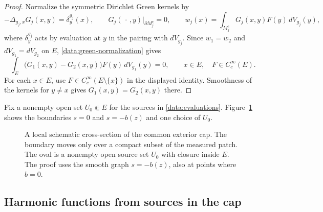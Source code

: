 \documentclass[11pt,a4paper]{article}
\theoremstyle{definition}
\theoremstyle{remark}
\numberwithin{equation}{section}
\begin{document}
\begin{proof}
Normalize the symmetric Dirichlet Green kernels by
\begin{equation}\label{data:green-normalization}
 -\Delta_{g_j,x}G_j(x,y)=\delta_y^{g_j}(x),\qquad
 G_j(\,\cdot\,,y)|_{\partial M_j^e}=0,
 \qquad
 w_j(x)=\int_{M_j^e}G_j(x,y)F(y)\,dV_{g_j}(y),
\end{equation}
where $\delta_y^{g_j}$ acts by evaluation at $y$ in the pairing with
$dV_{g_j}$. Since $w_1=w_2$ and $dV_{g_1}=dV_{g_2}$ on $E$,
\eqref{data:green-normalization} gives
\[
 \int_E \bigl(G_1(x,y)-G_2(x,y)\bigr)F(y)\,dV_{g_1}(y)=0,
 \qquad x\in E,\quad F\in C_c^\infty(E).
\]
For each $x\in E$, use $F\in C_c^\infty(E\setminus\{x\})$ in the
displayed identity. Smoothness of the kernels for $y\ne x$ gives
$G_1(x,y)=G_2(x,y)$ there.
\end{proof}

Fix a nonempty open set $U_0\Subset E$ for the sources in
\eqref{data:evaluations}. Figure~\ref{data:cap-figure} shows the
boundaries $s=0$ and $s=-b(z)$ and one choice of $U_0$.

\begin{figure}[htbp]
\centering
{}
\caption{A local schematic cross-section of the common exterior cap.
The boundary moves only over a compact subset of the measured patch.
The oval is a nonempty open source set $U_0$ with closure inside $E$.
The proof uses the smooth graph $s=-b(z)$, also at points where $b=0$.}
\label{data:cap-figure}
\end{figure}

\subsection{Harmonic functions from sources in the cap}
\end{document}
